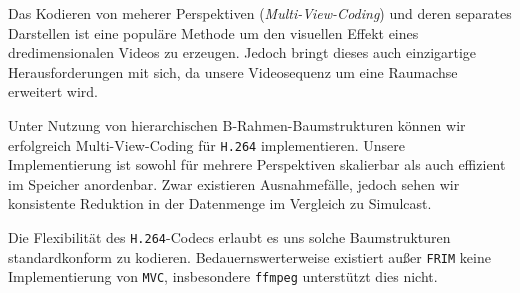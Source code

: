 \noindent\newline Das Kodieren von meherer Perspektiven (\textit{Multi-View-Coding}) und deren separates Darstellen ist
eine popul\"are Methode um den visuellen Effekt eines dredimensionalen Videos zu erzeugen.
Jedoch bringt dieses auch einzigartige Herausforderungen mit sich, da unsere Videosequenz um eine Raumachse erweitert
wird.

\noindent\newline Unter Nutzung von hierarchischen B-Rahmen-Baumstrukturen k\"onnen wir erfolgreich Multi-View-Coding
f\"ur \texttt{H.264} implementieren.
Unsere Implementierung ist sowohl f\"ur mehrere Perspektiven skalierbar als auch effizient im Speicher
anordenbar. Zwar existieren Ausnahmef\"alle, jedoch sehen wir konsistente Reduktion in der Datenmenge im Vergleich
zu Simulcast.

\noindent\newline Die Flexibilit\"at des \texttt{H.264}-Codecs erlaubt es uns solche Baumstrukturen standardkonform
zu kodieren.
Bedauernswerterweise existiert außer \texttt{FRIM} keine Implementierung von \texttt{MVC}, insbesondere \texttt{ffmpeg}
unterstützt dies nicht.






